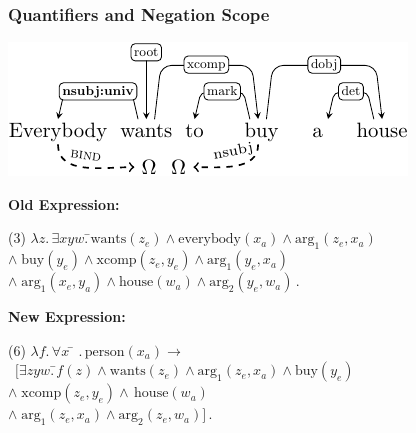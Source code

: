\documentclass[mathserif,12pt]{beamer}
\renewcommand{\land}{\wedge}
\newcommand{\lspace}{.\,}
\begin{document}
\begin{frame}
\frametitle{Quantifiers and Negation Scope}
\centering
\includegraphics[trim=0em 0em 0em 0em,clip=true,scale=1.1]{figures/everybody-wants-buy-house-enhanced-with-univ-crop}

\raggedright \textbf{Old Expression:}
\begin{tabbing}
(3) $\lambda z \lspace \exists xyw \lspace$\=$\mathrm{wants}(z_e) \land \mathrm{everybody}(x_a) \land \mathrm{arg_1}(z_e, x_a) $\\
\>$\land\; \mathrm{buy}(y_e) \land \mathrm{xcomp}(z_e, y_e) \land \mathrm{arg_1}(y_e, x_a)$\\
\>$\land \; \mathrm{arg_1}(x_e,y_a) \land \mathrm{house}(w_a) \land \mathrm{arg_2}(y_e, w_a)$\,.
\end{tabbing}

\raggedright \textbf{New Expression:}
\begin{tabbing}
(6) $\lambda f \lspace \forall x$ \= $\lspace \mathrm{person}(x_a) \rightarrow$\\\
\>$[\exists zyw \lspace$\=$f(z) \land \mathrm{wants}(z_e) \land \mathrm{arg_1}(z_e, x_a)\land \mathrm{buy}(y_e)$\\
\>\>$\land\; \mathrm{xcomp}(z_e, y_e) \land\, \mathrm{house}(w_a)$\\
\>\>$\land\; \mathrm{arg_1}(z_e, x_a) \land \mathrm{arg_2}(z_e, w_a)]$\,.
\end{tabbing}

\end{frame} 

\end{document}
